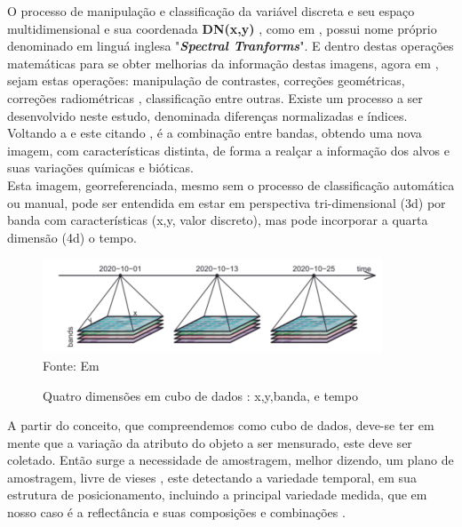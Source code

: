 %
  \hspace*{1.25 cm} O processo  de manipulação e classificação da variável discreta e seu espaço multidimensional e sua coordenada  \textbf{DN(x,y) }, como em \cite[p.~183]{Schowengerdt}, possui nome próprio denominado em linguá inglesa  "\textbf{\textit{Spectral Tranforms}}". E dentro destas operações matemáticas para se obter melhorias da informação destas imagens, agora em \cite[p.~485]{Lilesat}, sejam estas operações: manipulação de contrastes, correções geométricas, correções radiométricas , classificação entre outras. Existe um processo a ser desenvolvido neste estudo, denominada diferenças normalizadas e índices.\\
%
%
 \hspace*{1.25 cm} Voltando a \cite{Centeno} e este citando \cite[p.339]{Chuvieco}, é a combinação entre bandas, obtendo uma nova imagem, com características distinta, de forma a realçar a informação dos alvos e suas variações químicas e bióticas. \\
%
\hspace*{1.25 cm} Esta imagem, georreferenciada, mesmo sem o processo de classificação automática ou manual, pode ser entendida em estar em  perspectiva tri-dimensional (3d) por banda com características (x,y, valor discreto), mas pode incorporar  a quarta dimensão (4d) o tempo.
\begin{figure}[H]
	\centering  \small \caption{Quatro dimensões  em cubo de dados : x,y,banda, e tempo}
	\includegraphics[width=0.97\linewidth]{FIGURAS//quatroDimensao}
	\label{fig:quatroDimensao}{ Fonte:  Em \cite[p.60]{Pebesma} }
\end{figure}
  \hspace*{1.25 cm} A partir do conceito, que compreendemos como cubo de dados, deve-se ter em mente que a variação da atributo do objeto a ser mensurado, este deve ser coletado. Então  surge a necessidade de amostragem, melhor dizendo, um plano de amostragem, livre de vieses , este detectando a variedade temporal, em sua estrutura de posicionamento, incluindo a principal variedade medida, que em nosso caso é a reflectância e suas composições e combinações .
%
%
